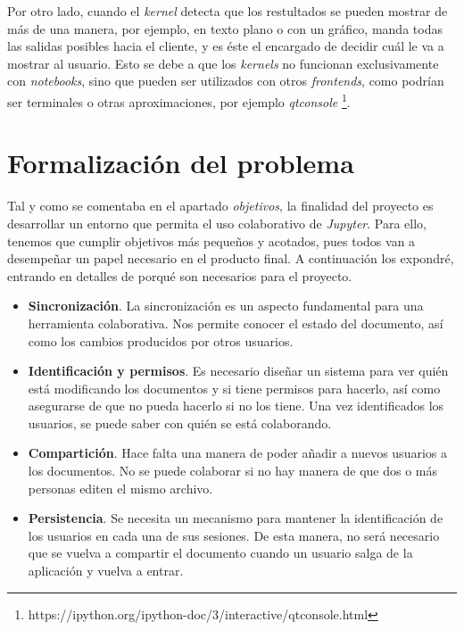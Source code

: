 \documentclass[11pt,spanish,listoffigures,listoftables]{tfgetsinf}
\begin{document}
Por otro lado, cuando el \textit{kernel} detecta que los restultados se pueden mostrar de más de una manera, por ejemplo, en texto plano o con un gráfico, manda todas las salidas posibles hacia el cliente, y es éste el encargado de decidir cuál le va a mostrar al usuario. Esto se debe a que los \textit{kernels} no funcionan exclusivamente con \textit{notebooks}, sino que pueden ser utilizados con otros \textit{frontends}, como podrían ser terminales o otras aproximaciones, por ejemplo \textit{qtconsole} \footnote{https://ipython.org/ipython-doc/3/interactive/qtconsole.html}.



\section{Formalización del problema}
\label{sec:formalizacion}

Tal y como se comentaba en el apartado \textit{objetivos}, la finalidad del proyecto es desarrollar un entorno que permita el uso colaborativo de \textit{Jupyter}. Para ello, tenemos que cumplir objetivos más pequeños y acotados, pues todos van a desempeñar un papel necesario en el producto final. A continuación los expondré, entrando en detalles de porqué son necesarios para el proyecto.

\begin{itemize}

\item \textbf{Sincronización}. La sincronización es un aspecto fundamental para una herramienta colaborativa. Nos permite conocer el estado del documento, así como los cambios producidos por otros usuarios. 


\item \textbf{Identificación y permisos}. Es necesario diseñar un sistema para ver quién está modificando los documentos y si tiene permisos para hacerlo, así como asegurarse de que no pueda hacerlo si no los tiene. Una vez identificados los usuarios, se puede saber con quién se está colaborando.

\item \textbf{Compartición}. Hace falta una manera de poder añadir a nuevos usuarios a los documentos. No se puede  colaborar si no hay manera de que dos o más personas editen el mismo archivo.

\item \textbf{Persistencia}. Se necesita un mecanismo para mantener la identificación de los usuarios en cada una de sus sesiones. De esta manera, no será necesario que se vuelva a compartir el documento cuando un usuario salga de la aplicación y vuelva a entrar.

\end{itemize}
\end{document}
